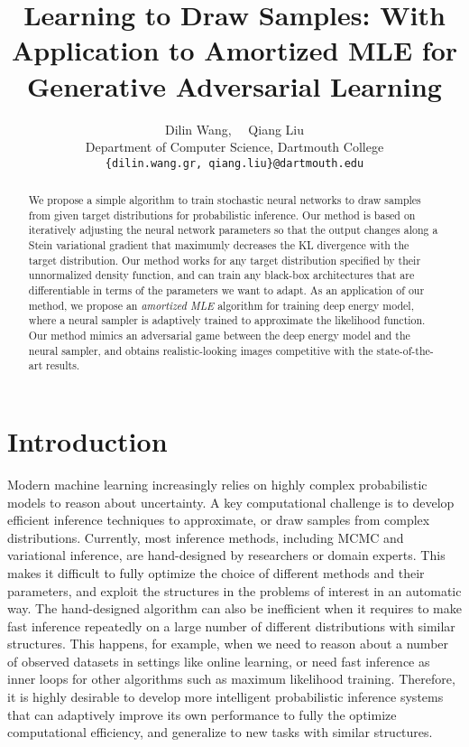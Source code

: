 \documentclass{article} \usepackage{iclr2017_conference,times}
\title{Learning to Draw Samples: With Application to Amortized MLE for Generative Adversarial Learning}
\author{Dilin Wang, ~~Qiang Liu\\
Department of Computer Science, Dartmouth College\\
\texttt{\{dilin.wang.gr, qiang.liu\}@dartmouth.edu}
}
\begin{document}
\maketitle


\begin{abstract}
We propose a simple algorithm to train stochastic 
neural networks 
to draw samples from given target distributions for probabilistic inference. 
Our method is based on iteratively adjusting the neural network parameters 
so that the output changes along a Stein variational gradient \citep{liu2016stein} that maximumly decreases 
the KL divergence with the target distribution. 
Our method works for any target distribution specified by their unnormalized density function, 
and can train any black-box architectures that are differentiable in terms of the parameters we want to adapt. 
As an application of our method, we propose an  \emph{amortized MLE} algorithm for training deep energy model, where a neural sampler is adaptively trained to 
approximate the likelihood function. Our method mimics an adversarial game 
between the deep energy model and the neural sampler, and obtains realistic-looking images competitive with the state-of-the-art results. 
\end{abstract}



\section{Introduction}


Modern machine learning increasingly relies on highly complex probabilistic models to reason about uncertainty.  
A key computational challenge is to develop efficient inference techniques to approximate, or draw samples from complex distributions. 
Currently, most inference methods, including MCMC and variational inference, are hand-designed by researchers or domain experts. 
This makes it difficult to fully optimize the choice of different methods and their parameters, and exploit the structures in the problems of interest in an automatic way. 
The hand-designed algorithm can also be inefficient when it requires to make fast inference repeatedly on a large number of different distributions with similar structures. 
This happens, for example, when we need to reason about a number of observed datasets in settings like online learning, 
or need fast inference as inner loops for other algorithms such as maximum likelihood training. 
Therefore, it is highly desirable to develop more intelligent probabilistic inference systems that can adaptively improve its own performance to fully the optimize computational efficiency, and generalize to new tasks with similar structures. 
\end{document}
